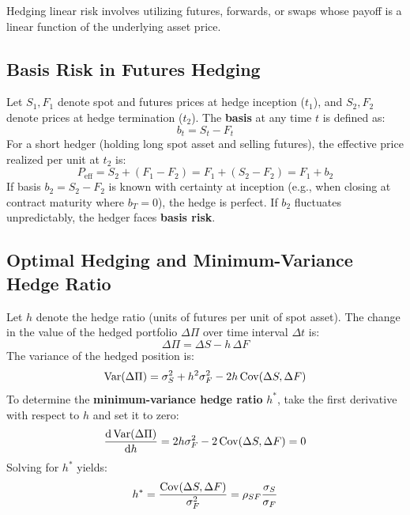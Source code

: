Hedging linear risk involves utilizing futures, forwards, or swaps whose payoff is a linear function of the underlying asset price.

\subsection{Basis Risk in Futures Hedging}

Let $S_1, F_1$ denote spot and futures prices at hedge inception ($t_1$), and $S_2, F_2$ denote prices at hedge termination ($t_2$). The \textbf{basis} at any time $t$ is defined as:
\begin{equation}
b_t = S_t - F_t
\end{equation}
For a short hedger (holding long spot asset and selling futures), the effective price realized per unit at $t_2$ is:
\begin{equation}
P_{\text{eff}} = S_2 + (F_1 - F_2) = F_1 + (S_2 - F_2) = F_1 + b_2
\end{equation}
If basis $b_2 = S_2 - F_2$ is known with certainty at inception (e.g., when closing at contract maturity where $b_T = 0$), the hedge is perfect. If $b_2$ fluctuates unpredictably, the hedger faces \textbf{basis risk}.

\subsection{Optimal Hedging and Minimum-Variance Hedge Ratio}

Let $h$ denote the hedge ratio (units of futures per unit of spot asset). The change in the value of the hedged portfolio $\Delta \Pi$ over time interval $\Delta t$ is:
\begin{equation}
\Delta \Pi = \Delta S - h \, \Delta F
\end{equation}
The variance of the hedged position is:
\begin{equation}
\operatorname{Var}(\Delta \Pi) = \sigma_S^2 + h^2 \sigma_F^2 - 2 h \operatorname{Cov}(\Delta S, \Delta F)
\end{equation}
To determine the \textbf{minimum-variance hedge ratio} $h^*$, take the first derivative with respect to $h$ and set it to zero:
\begin{equation}
\frac{\mathrm{d} \operatorname{Var}(\Delta \Pi)}{\mathrm{d} h} = 2 h \sigma_F^2 - 2 \operatorname{Cov}(\Delta S, \Delta F) = 0
\end{equation}
Solving for $h^*$ yields:
\begin{equation}
h^* = \frac{\operatorname{Cov}(\Delta S, \Delta F)}{\sigma_F^2} = \rho_{SF} \frac{\sigma_S}{\sigma_F}
\end{equation}

